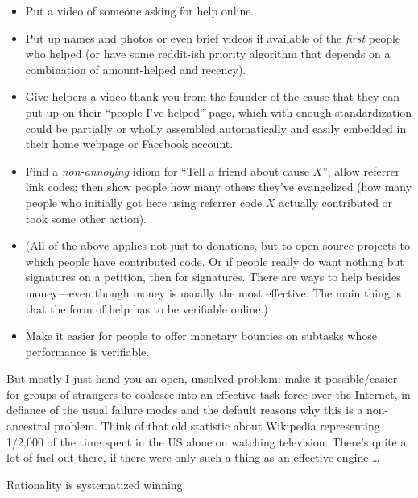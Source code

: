 \begin{itemize}
\item {
 Put a video of someone asking for help online.}

\item {
 Put up names and photos or even brief videos if available of the
\textit{first} people who helped (or have some reddit-ish priority
algorithm that depends on a combination of amount-helped and recency).}

\item {
 Give helpers a video thank-you from the founder of the cause that
they can put up on their ``people I've
helped'' page, which with enough standardization
could be partially or wholly assembled automatically and easily
embedded in their home webpage or Facebook account.}

\item {
 Find a \textit{non-annoying} idiom for ``Tell a
friend about cause $X$''; allow referrer link codes;
then show people how many others they've evangelized
(how many people who initially got here using referrer code $X$ actually
contributed or took some other action).}

\item {
 (All of the above applies not just to donations, but to
open-source projects to which people have contributed code. Or if
people really do want nothing but signatures on a petition, then for
signatures. There are ways to help besides money---even though money is
usually the most effective. The main thing is that the form of help has
to be verifiable online.)}

\item {
 Make it easier for people to offer monetary bounties on subtasks
whose performance is verifiable.}
\end{itemize}

{
 But mostly I just hand you an open, unsolved problem: make it
possible/easier for groups of strangers to coalesce into an effective
task force over the Internet, in defiance of the usual failure modes
and the default reasons why this is a non-ancestral problem. Think of
that old statistic about Wikipedia representing 1/2,000 of the time
spent in the US alone on watching television. There's
quite a lot of fuel out there, if there were only such a thing as an
effective engine \ldots}

\myendsectiontext


{
 Rationality is systematized winning. }

